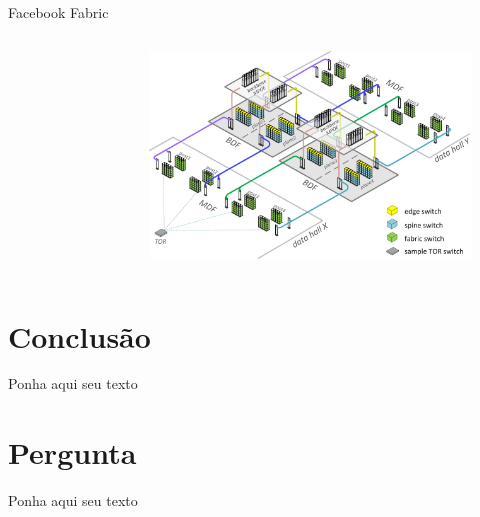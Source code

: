 \documentclass[aspectratio=169]{beamer}
\begin{document}
\begin{frame} {Facebook Fabric}
\begin{columns}
\begin{figure}[ht]
                                            
                 
                 
                  \label{fig:problems}
              \end{figure}
                         
             \begin{figure}[ht]    
                             \includegraphics[scale=0.23]{phisic_fabric.jpg}
                          
                                                                     
                                           
                            
                             \label{fig:problems}
                         \end{figure}
            
            
            \end{columns}
            
             
          
    \end{frame}

\section{Conclusão}
    \begin{frame} 
        Ponha aqui seu texto
    \end{frame}
        
\section{Pergunta}
    \begin{frame} 
        Ponha aqui seu texto
    \end{frame}
    
\end{document}
